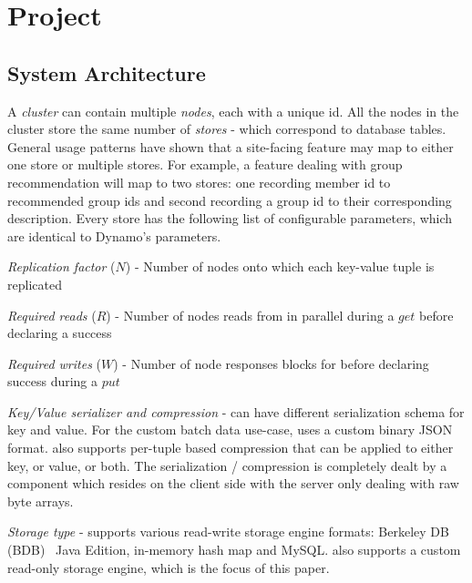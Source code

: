 \section{Project \projectname{}}

\subsection{System Architecture}
\label{sec:system_architecture}

A \projectname{} \emph{cluster} can contain multiple \emph{nodes}, each with a unique id. All the nodes in the cluster store the same number of \emph{stores} - which correspond to database tables. General usage patterns have shown that a site-facing feature may map to either one store or multiple stores. For example, a feature dealing with group recommendation will map to two stores: one recording member id to recommended group ids and second recording a group id to their corresponding description. Every store has the following list of configurable parameters, which are identical to Dynamo's parameters. 
\begin{compactitem}
	\item \emph {Replication factor} ($N$) - Number of nodes onto which each key-value tuple is replicated
	\item \emph {Required reads} ($R$) - Number of nodes \projectname{} reads from in parallel during a $get$ before declaring a success
	\item \emph {Required writes} ($W$) - Number of node responses \projectname{} blocks for before declaring success during a $put$
	\item \emph {Key/Value serializer and compression} - \projectname{} can have different serialization schema for key and value. For the custom batch data use-case, \projectname{} uses a custom binary JSON format. \projectname{} also supports per-tuple based compression that can be applied to either key, or value, or both. The serialization / compression is completely dealt by a component which resides on the client side with the server only dealing with raw byte arrays. 
	\item \emph {Storage type} - \projectname{} supports various read-write storage engine formats: Berkeley DB (BDB)~\cite{bdb} Java Edition, in-memory hash map and MySQL. \projectname{} also supports a custom read-only storage engine, which is the focus of this paper.  
\end{compactitem}

